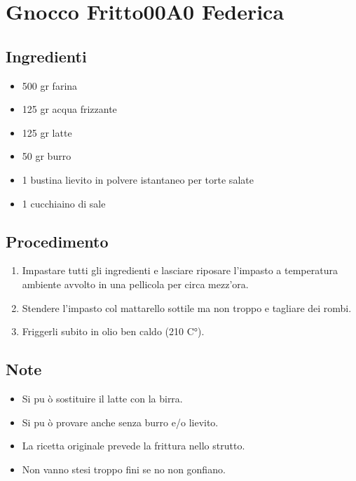 \section{Gnocco Fritto00A0 Federica}
\subsection{Ingredienti}
\begin{itemize}
\item 500 gr farina  
\item 125 gr acqua frizzante  
\item 125 gr latte  
\item 50 gr burro  
\item 1 bustina lievito in polvere istantaneo per torte salate  
\item 1 cucchiaino di sale
\end{itemize}
\subsection{Procedimento}
\begin{enumerate}
\item  Impastare tutti gli ingredienti e lasciare riposare l'impasto a temperatura ambiente avvolto in una pellicola per circa mezz'ora.  
\item  Stendere l'impasto col mattarello sottile ma non troppo e tagliare dei rombi.  
\item  Friggerli subito in olio ben caldo (210 C°).
\end{enumerate}
\subsection{Note}
\begin{itemize}
\item Si pu ò sostituire il latte con la birra.  
\item Si pu ò provare anche senza burro e/o lievito.  
\item La ricetta originale prevede la frittura nello strutto.  
\item Non vanno stesi troppo fini se no non gonfiano.
\end{itemize}
